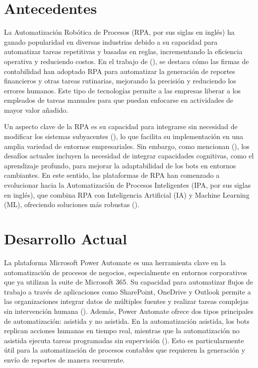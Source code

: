 \documentclass[letter,oneside,12pt,spanish]{report}
\begin{document}
\section{Antecedentes}

\noindent La Automatización Robótica de Procesos (RPA, por sus siglas en inglés) ha ganado popularidad en diversas industrias debido a su capacidad para automatizar tareas repetitivas y basadas en reglas, incrementando la eficiencia operativa y reduciendo costos. En el trabajo de (\cite{cooper2019rpa}), se destaca cómo las firmas de contabilidad han adoptado RPA para automatizar la generación de reportes financieros y otras tareas rutinarias, mejorando la precisión y reduciendo los errores humanos. Este tipo de tecnologías permite a las empresas liberar a los empleados de tareas manuales para que puedan enfocarse en actividades de mayor valor añadido.

\noindent Un aspecto clave de la RPA es su capacidad para integrarse sin necesidad de modificar los sistemas subyacentes (\cite{aalst2018bpm}), lo que facilita su implementación en una amplia variedad de entornos empresariales. Sin embargo, como mencionan (\cite{syed2020rpa}), los desafíos actuales incluyen la necesidad de integrar capacidades cognitivas, como el aprendizaje profundo, para mejorar la adaptabilidad de los bots en entornos cambiantes. En este sentido, las plataformas de RPA han comenzado a evolucionar hacia la Automatización de Procesos Inteligentes (IPA, por sus siglas en inglés), que combina RPA con Inteligencia Artificial (IA) y Machine Learning (ML), ofreciendo soluciones más robustas (\cite{gami2019ipa}).

\section{Desarrollo Actual}

\noindent La plataforma Microsoft Power Automate es una herramienta clave en la automatización de procesos de negocios, especialmente en entornos corporativos que ya utilizan la suite de Microsoft 365. Su capacidad para automatizar flujos de trabajo a través de aplicaciones como SharePoint, OneDrive y Outlook permite a las organizaciones integrar datos de múltiples fuentes y realizar tareas complejas sin intervención humana (\cite{microsoft2024powerautomate}). Además, Power Automate ofrece dos tipos principales de automatización: asistida y no asistida. En la automatización asistida, los bots replican acciones humanas en tiempo real, mientras que la automatización no asistida ejecuta tareas programadas sin supervisión (\cite{xerox2023powerautomate}). Esto es particularmente útil para la automatización de procesos contables que requieren la generación y envío de reportes de manera recurrente.
\end{document}
